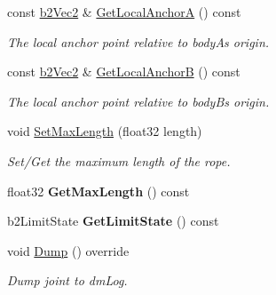 \begin{DoxyCompactItemize}
const \hyperlink{structb2_vec2}{b2\+Vec2} \& \hyperlink{classb2_rope_joint_a5fb600991e676e61e266ecb99448bb86}{Get\+Local\+AnchorA} () const
\begin{DoxyCompactList}\small\item\em The local anchor point relative to bodyA\textquotesingle{}s origin. \end{DoxyCompactList}\item 
\mbox{\label{classb2_rope_joint_a8a9b925c7ffa11d331ba369cc9fe2ac5}} 
const \hyperlink{structb2_vec2}{b2\+Vec2} \& \hyperlink{classb2_rope_joint_a8a9b925c7ffa11d331ba369cc9fe2ac5}{Get\+Local\+AnchorB} () const
\begin{DoxyCompactList}\small\item\em The local anchor point relative to bodyB\textquotesingle{}s origin. \end{DoxyCompactList}\item 
\mbox{\label{classb2_rope_joint_a92cea201d21acd2f2a7cc9b00e165848}} 
void \hyperlink{classb2_rope_joint_a92cea201d21acd2f2a7cc9b00e165848}{Set\+Max\+Length} (float32 length)
\begin{DoxyCompactList}\small\item\em Set/\+Get the maximum length of the rope. \end{DoxyCompactList}\item 
\mbox{\label{classb2_rope_joint_abdcc1962f25103a49f6e3f4182559efa}} 
float32 {\bfseries Get\+Max\+Length} () const
\item 
\mbox{\label{classb2_rope_joint_ab7b606273b65339f0ab502675f32997e}} 
b2\+Limit\+State {\bfseries Get\+Limit\+State} () const
\item 
\mbox{\label{classb2_rope_joint_a0028d3d3710bf1a9a905e9b55a4f37c5}} 
void \hyperlink{classb2_rope_joint_a0028d3d3710bf1a9a905e9b55a4f37c5}{Dump} () override
\begin{DoxyCompactList}\small\item\em Dump joint to dm\+Log. \end{DoxyCompactList}\end{DoxyCompactItemize}
